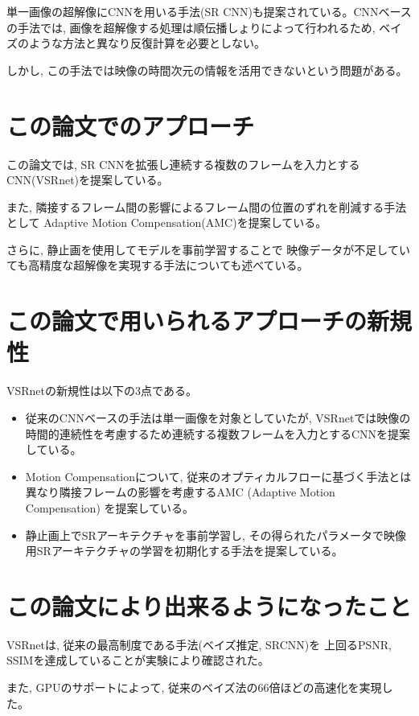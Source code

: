 \documentclass[dvipdfmx,a4j,10pt, twocolumn]{jsarticle}
\begin{document}
単一画像の超解像にCNNを用いる手法(SR CNN)も提案されている。CNNベースの手法では, 
画像を超解像する処理は順伝播しょりによって行われるため, ベイズのような方法と異なり反復計算を必要としない。

しかし, この手法では映像の時間次元の情報を活用できないという問題がある。


\section*{この論文でのアプローチ}

この論文では, SR CNNを拡張し連続する複数のフレームを入力とするCNN(VSRnet)を提案している。

また, 隣接するフレーム間の影響によるフレーム間の位置のずれを削減する手法として
Adaptive Motion Compensation(AMC)を提案している。

さらに, 静止画を使用してモデルを事前学習することで
映像データが不足していても高精度な超解像を実現する手法についても述べている。


\section*{この論文で用いられるアプローチの新規性}

VSRnetの新規性は以下の3点である。

\begin{itemize}
    \item 従来のCNNベースの手法は単一画像を対象としていたが, VSRnetでは映像の時間的連続性を考慮するため連続する複数フレームを入力とするCNNを提案している。
    \item Motion Compensationについて, 従来のオプティカルフローに基づく手法とは異なり隣接フレームの影響を考慮するAMC (Adaptive Motion Compensation) を提案している。
    \item 静止画上でSRアーキテクチャを事前学習し, その得られたパラメータで映像用SRアーキテクチャの学習を初期化する手法を提案している。
\end{itemize}

\section*{この論文により出来るようになったこと}

VSRnetは, 従来の最高制度である手法(ベイズ推定, SRCNN)を
上回るPSNR, SSIMを達成していることが実験により確認された。

また, GPUのサポートによって, 従来のベイズ法の66倍ほどの高速化を実現した。
\end{document}
